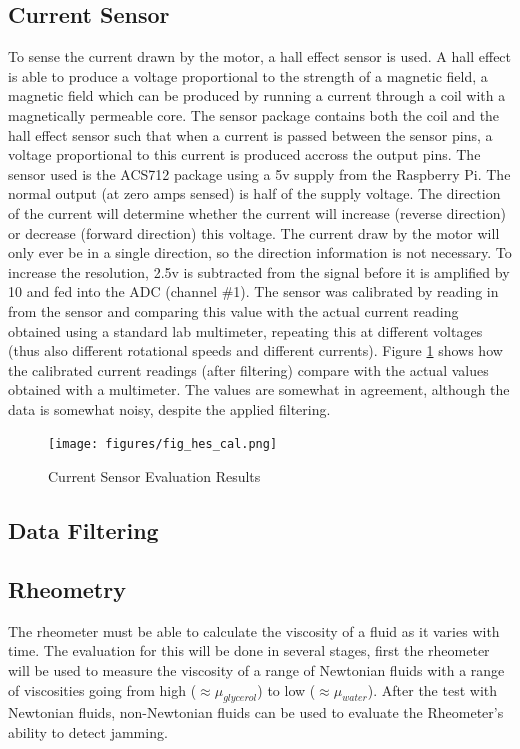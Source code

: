 \documentclass[twoside,a4]{report}
\def\br{\newline \newline \noindent}
\begin{document}
	\subsection*{Current Sensor}
	To sense the current drawn by the motor, a hall effect sensor is used. A hall effect is able to produce a voltage proportional to the strength of a magnetic field, a magnetic field which can be produced by running a current through a coil with a magnetically permeable core. The sensor package contains both the coil and the hall effect sensor such that when a current is passed between the sensor pins, a voltage proportional to this current is produced accross the output pins. The sensor used is the ACS712 package using a 5v supply from the Raspberry Pi. The normal output (at zero amps sensed) is half of the supply voltage. The direction of the current will determine whether the current will increase (reverse direction) or decrease (forward direction) this voltage. \br
	The current draw by the motor will only ever be in a single direction, so the direction information is not necessary. To increase the resolution, 2.5v is subtracted from the signal before it is amplified by 10 and fed into the ADC (channel \#1). \br
	The sensor was calibrated by reading in from the sensor and comparing this value with the actual current reading obtained using a standard lab multimeter, repeating this at different voltages (thus also different rotational speeds and different currents).\br
	Figure \ref{figcurevalres} shows how the calibrated current readings (after filtering) compare with the actual values obtained with a multimeter. The values are somewhat in agreement, although the data is somewhat noisy, despite the applied filtering.
	\begin{figure}[!htb]
		\centering
		\texttt{[image: figures/fig\_hes\_cal.png]}
		\caption{Current Sensor Evaluation Results}
		\label{figcurevalres}
	\end{figure} %
	
	\subsection*{Data Filtering}
	
	\subsection*{Rheometry}
	The rheometer must be able to calculate the viscosity of a fluid as it varies with time. The evaluation for this will be done in several stages, first the rheometer will be used to measure the viscosity of a range of Newtonian fluids with a range of viscosities going from high (\(\approx \mu_{glycerol}\)) to low (\(\approx \mu_{water}\)). After the test with Newtonian fluids, non-Newtonian fluids can be used to evaluate the Rheometer's ability to detect jamming.
	
\end{document}
